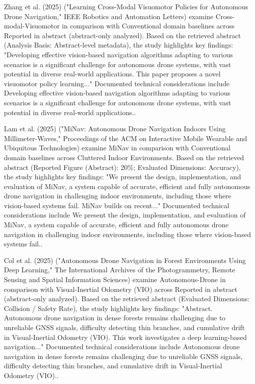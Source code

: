 \documentclass[10pt,twocolumn,letterpaper]{article}
\begin{document}
Zhang et al. (2025) \cite{ref3} ("Learning Cross-Modal Visuomotor Policies for Autonomous Drone Navigation," IEEE Robotics and Automation Letters) examine Cross-modal-Visuomotor in comparison with Conventional domain baselines across Reported in abstract (abstract-only analyzed). Based on the retrieved abstract (Analysis Basis: Abstract-level metadata), the study highlights key findings: "Developing effective vision-based navigation algorithms adapting to various scenarios is a significant challenge for autonomous drone systems, with vast potential in diverse real-world applications. This paper proposes a novel visuomotor policy learning..." Documented technical considerations include Developing effective vision-based navigation algorithms adapting to various scenarios is a significant challenge for autonomous drone systems, with vast potential in diverse real-world applications..

Lam et al. (2025) \cite{ref4} ("MiNav: Autonomous Drone Navigation Indoors Using Millimeter-Waves," Proceedings of the ACM on Interactive Mobile Wearable and Ubiquitous Technologies) examine MiNav in comparison with Conventional domain baselines across Cluttered Indoor Environments. Based on the retrieved abstract (Reported Figure (Abstract): 20\%; Evaluated Dimensions: Accuracy), the study highlights key findings: "We present the design, implementation, and evaluation of MiNav, a system capable of accurate, efficient and fully autonomous drone navigation in challenging indoor environments, including those where vision-based systems fail. MiNav builds on recent..." Documented technical considerations include We present the design, implementation, and evaluation of MiNav, a system capable of accurate, efficient and fully autonomous drone navigation in challenging indoor environments, including those where vision-based systems fail..

Col et al. (2025) \cite{ref5} ("Autonomous Drone Navigation in Forest Environments Using Deep Learning," The International Archives of the Photogrammetry, Remote Sensing and Spatial Information Sciences) examine Autonomous-Drone in comparison with Visual-Inertial Odometry (VIO) across Reported in abstract (abstract-only analyzed). Based on the retrieved abstract (Evaluated Dimensions: Collision / Safety Rate), the study highlights key findings: "Abstract. Autonomous drone navigation in dense forests remains challenging due to unreliable GNSS signals, difficulty detecting thin branches, and cumulative drift in Visual-Inertial Odometry (VIO). This work investigates a deep learning-based navigation..." Documented technical considerations include Autonomous drone navigation in dense forests remains challenging due to unreliable GNSS signals, difficulty detecting thin branches, and cumulative drift in Visual-Inertial Odometry (VIO)..
\end{document}
